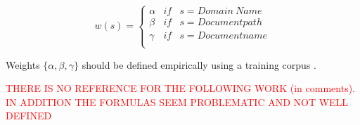 \begin{equation}\label{eq:jebary_url_weigh_cngrams_2}
	w(s) = \left\{
    	\begin{array}{lll}
        	\alpha & if & s = Domain\ Name \\
            \beta & if & s = Document path \\
            \gamma & if & s = Document name \\
         \end{array}
  \right.
\end{equation}

Weights $\{\alpha,\beta,\gamma\}$ should be defined empirically using a training corpus . 

\textcolor{red}{THERE IS NO REFERENCE FOR THE FOLLOWING WORK (in comments). IN ADDITION THE FORMULAS SEEM PROBLEMATIC AND NOT WELL DEFINED}





